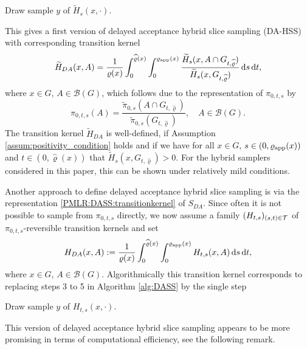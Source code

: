 \documentclass[sn-mathphys-num]{sn-jnl}%
\theoremstyle{thmstyleone}%
\theoremstyle{thmstyletwo}%
\theoremstyle{thmstylethree}%
\newcommand{\rhoapp}{\varrho_{{\rm app}}}
\newcommand{\change}[1]{\bgroup\color{black}#1\egroup}    %
\begin{document}
\begin{algorithmic}[1]%
\setcounter{ALG@line}{3}
	\State Draw sample $y$ of $\widetilde H_s(x,\cdot)$.
\end{algorithmic}
\vspace*{0.2cm}
This gives a first version of delayed acceptance hybrid slice sampling (DA-HSS) with corresponding transition kernel
\begin{align*}%
	\widetilde{H}_{DA}(x,A)= \frac{1}{\varrho(x)}\int_0^{\widehat{\varrho}(x)} \int_0^{\rhoapp(x)} \frac{\widetilde H_s(x,A \cap G_{t, \widehat{\varrho}})}{\widetilde H_s(x,G_{t, \widehat{\varrho}})}  \, \mathrm{d}s  \, \mathrm{d}t,
\end{align*}
where $x\in G$, $A\in\mathcal{B}(G)$, which follows due to the representation of $\pi_{0,t,s}$ by 
\[
\pi_{0,t,s}(A)=\frac{\widetilde{\pi}_{0,s}(A \cap G_{t, \widehat{\varrho}})}{\widetilde{\pi}_{0,s}(G_{t, \widehat{\varrho}})}, \quad A\in\mathcal{B}(G).
\]
The transition kernel $\widetilde{H}_{DA}$ is well-defined, if Assumption \ref{assum:positivity_condition} holds and if we have for all $x\in G$, $s\in(0, \rhoapp(x))$ and $t\in (0,\widehat{\varrho}(x))$ that $\widetilde H_s(x,G_{t, \widehat{\varrho}})>0$. For the hybrid samplers considered in this paper, this can be shown under relatively mild conditions.

Another approach to define delayed acceptance hybrid slice sampling is via the representation \eqref{PMLR:DASS:transitionkernel} of $S_{DA}$. %
Since often it is not possible to sample from $\pi_{0,t,s}$ directly, we now assume a family $(H_{t,s})_{\change{(s,t)\in \mathcal T}}$ of $\pi_{0,t,s}$-reversible transition kernels and set
\begin{align}
    \label{PMLR:DAHSS:transitionkernel}
	H_{DA}(x,A)
    := \frac{1}{\varrho(x)}\int_0^{\widehat{\varrho}(x)} \int_0^{\rhoapp(x)} H_{t,s}(x,A)  \, \mathrm{d}s  \, \mathrm{d}t,
\end{align}
where $x\in G$, $A\in\mathcal{B}(G)$.
Algorithmically this transition kernel corresponds to replacing steps 3 to 5 in Algorithm \ref{alg:DASS} by the single step
\begin{algorithmic}[1]%
	\setcounter{ALG@line}{3}
	\State Draw sample $y$ of $H_{t,s}(x,\cdot)$.
\end{algorithmic}
This version of delayed acceptance hybrid slice sampling appears to be more promising in terms of computational efficiency, see the following remark.
\end{document}
